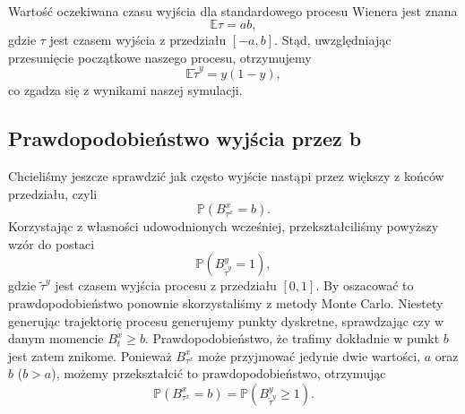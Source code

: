 \documentclass[12pt]{mwart}
\begin{document}
	Wartość oczekiwana czasu wyjścia dla standardowego procesu Wienera jest znana\textsuperscript{\cite{art}}
	\begin{equation*}
		\mathbb{E}\mathbb{\tau}=ab,
	\end{equation*}
	gdzie $\tau$ jest czasem wyjścia z przedziału $[-a, b]$. Stąd, uwzględniając przesunięcie początkowe naszego procesu, otrzymujemy
	\begin{equation*}
		\mathbb{E}\widetilde\tau^y=y(1-y),
	\end{equation*} 
	co zgadza się z wynikami naszej symulacji.\\
	
	\subsection{Prawdopodobieństwo wyjścia przez b}
	\noindent Chcieliśmy jeszcze sprawdzić jak często wyjście nastąpi przez większy z końców przedziału, czyli%
	\begin{equation*}
		\mathbb{P}\left(B^x_{\tau^x}=b\right).
	\end{equation*}
	Korzystając z własności udowodnionych wcześniej, przekształciliśmy powyższy wzór do postaci%
	\begin{equation*}
		\mathbb{P}\left(B^y_{\widetilde\tau^y}=1\right),
	\end{equation*}
	gdzie $\widetilde\tau^y$ jest czasem wyjścia procesu z przedziału $[0, 1]$. By oszacować to prawdopodobieństwo ponownie skorzystaliśmy z metody Monte Carlo. Niestety generując trajektorię procesu generujemy punkty dyskretne, sprawdzając czy w danym momencie $B^x_t\geqslant b$. Prawdopodobieństwo, że trafimy dokładnie w punkt $b$ jest zatem znikome. Ponieważ $B^x_{\tau^x}$ może przyjmować jedynie dwie wartości, $a$ oraz $b$ ($b>a$), możemy przekształcić to prawdopodobieństwo, otrzymując
	\begin{equation}\label{eq:dyskretyzaction}
		\mathbb{P}\left(B^x_{\tau^x}=b\right)=\mathbb{P}\left(B^y_{\widetilde{\tau}^y}\geqslant1\right).
	\end{equation}
\end{document}
